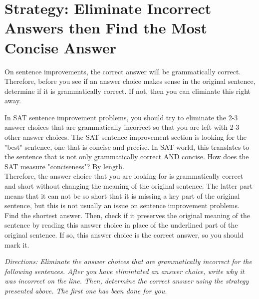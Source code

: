\section{Strategy: Eliminate Incorrect Answers then Find the Most Concise Answer}

On sentence improvements, the correct answer will be grammatically correct. Therefore, before
you see if an answer choice makes sense in the original sentence, determine if it is grammatically
correct. If not, then you can eliminate this right away.

In SAT sentence improvement problems, you should try to eliminate the 2-3 answer choices that are grammatically incorrect so that you are left with 2-3 other answer choices. The SAT sentence improvement section is looking for the "best" sentence, one that is concise and precise. In SAT world, this translates to the sentence that is not only grammatically correct AND concise. How does the SAT measure "conciseness"? By length. \\

Therefore, the answer choice that you are looking for is grammatically correct and short without changing the meaning of the original sentence. The latter part means that it can not be so short that it is missing a key part of the original sentence,
but this is not usually an issue on sentence improvement problems. \\

Find the shortest answer. Then, check if it preserves the original meaning of the sentence by reading this answer choice in place of the underlined part of the original sentence. If so, this answer choice is the correct answer, so you should mark it.

\bigskip
\textit{Directions: Eliminate the answer choices that are grammatically incorrect for the following sentences. After you have elimintated an answer choice, write why it was incorrect on the line. Then, determine the correct answer using the strategy presented above. The first one has been done for you.}


